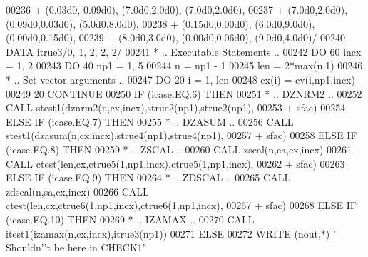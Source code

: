 \begin{DoxyCode}
00236      +                  (0.03d0,-0.09d0), (7.0d0,2.0d0), (7.0d0,2.0d0),
00237      +                  (7.0d0,2.0d0), (0.09d0,0.03d0), (5.0d0,8.0d0),
00238      +                  (0.15d0,0.00d0), (6.0d0,9.0d0), (0.00d0,0.15d0),
00239      +                  (8.0d0,3.0d0), (0.00d0,0.06d0), (9.0d0,4.0d0)/
00240       \textcolor{keyword}{DATA}              itrue3/0, 1, 2, 2, 2/
00241 \textcolor{comment}{*     .. Executable Statements ..}
00242       \textcolor{keywordflow}{DO} 60 incx = 1, 2
00243          \textcolor{keywordflow}{DO} 40 np1 = 1, 5
00244             n = np1 - 1
00245             len = 2*max(n,1)
00246 \textcolor{comment}{*           .. Set vector arguments ..}
00247             \textcolor{keywordflow}{DO} 20 i = 1, len
00248                cx(i) = cv(i,np1,incx)
00249    20       \textcolor{keywordflow}{CONTINUE}
00250             \textcolor{keywordflow}{IF} (icase.EQ.6) \textcolor{keywordflow}{THEN}
00251 \textcolor{comment}{*              .. DZNRM2 ..}
00252                \textcolor{keyword}{CALL }stest1(dznrm2(n,cx,incx),strue2(np1),strue2(np1),
00253      +                     sfac)
00254             \textcolor{keywordflow}{ELSE} \textcolor{keywordflow}{IF} (icase.EQ.7) \textcolor{keywordflow}{THEN}
00255 \textcolor{comment}{*              .. DZASUM ..}
00256                \textcolor{keyword}{CALL }stest1(dzasum(n,cx,incx),strue4(np1),strue4(np1),
00257      +                     sfac)
00258             \textcolor{keywordflow}{ELSE} \textcolor{keywordflow}{IF} (icase.EQ.8) \textcolor{keywordflow}{THEN}
00259 \textcolor{comment}{*              .. ZSCAL ..}
00260                \textcolor{keyword}{CALL }zscal(n,ca,cx,incx)
00261                \textcolor{keyword}{CALL }ctest(len,cx,ctrue5(1,np1,incx),ctrue5(1,np1,incx),
00262      +                    sfac)
00263             \textcolor{keywordflow}{ELSE} \textcolor{keywordflow}{IF} (icase.EQ.9) \textcolor{keywordflow}{THEN}
00264 \textcolor{comment}{*              .. ZDSCAL ..}
00265                \textcolor{keyword}{CALL }zdscal(n,sa,cx,incx)
00266                \textcolor{keyword}{CALL }ctest(len,cx,ctrue6(1,np1,incx),ctrue6(1,np1,incx),
00267      +                    sfac)
00268             \textcolor{keywordflow}{ELSE} \textcolor{keywordflow}{IF} (icase.EQ.10) \textcolor{keywordflow}{THEN}
00269 \textcolor{comment}{*              .. IZAMAX ..}
00270                \textcolor{keyword}{CALL }itest1(izamax(n,cx,incx),itrue3(np1))
00271             \textcolor{keywordflow}{ELSE}
00272                \textcolor{keyword}{WRITE} (nout,*) \textcolor{stringliteral}{' Shouldn'}\textcolor{stringliteral}{'t be here in CHECK1'}

\end{DoxyCode}

